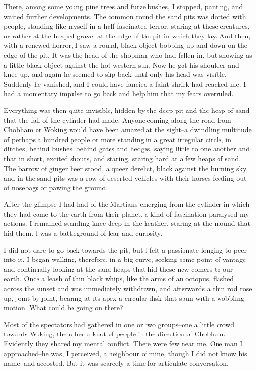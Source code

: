 There, among some young pine trees and furze bushes, I stopped,
panting, and waited further developments. The common round the sand
pits was dotted with people, standing like myself in a
half-fascinated terror, staring at these creatures, or rather at
the heaped gravel at the edge of the pit in which they lay. And
then, with a renewed horror, I saw a round, black object bobbing up
and down on the edge of the pit. It was the head of the shopman who
had fallen in, but showing as a little black object against the hot
western sun. Now he got his shoulder and knee up, and again he
seemed to slip back until only his head was visible. Suddenly he
vanished, and I could have fancied a faint shriek had reached me. I
had a momentary impulse to go back and help him that my fears
overruled.

Everything was then quite invisible, hidden by the deep pit and the
heap of sand that the fall of the cylinder had made. Anyone coming
along the road from Chobham or Woking would have been amazed at the
sight--a dwindling multitude of perhaps a hundred people or more
standing in a great irregular circle, in ditches, behind bushes,
behind gates and hedges, saying little to one another and that in
short, excited shouts, and staring, staring hard at a few heaps of
sand. The barrow of ginger beer stood, a queer derelict, black
against the burning sky, and in the sand pits was a row of deserted
vehicles with their horses feeding out of nosebags or pawing the
ground.

After the glimpse I had had of the Martians emerging from the
cylinder in which they had come to the earth from their planet, a
kind of fascination paralysed my actions. I remained standing
knee-deep in the heather, staring at the mound that hid them. I was
a battleground of fear and curiosity.

I did not dare to go back towards the pit, but I felt a passionate
longing to peer into it. I began walking, therefore, in a big
curve, seeking some point of vantage and continually looking at the
sand heaps that hid these new-comers to our earth. Once a leash of
thin black whips, like the arms of an octopus, flashed across the
sunset and was immediately withdrawn, and afterwards a thin rod
rose up, joint by joint, bearing at its apex a circular disk that
spun with a wobbling motion. What could be going on there?

Most of the spectators had gathered in one or two groups--one a
little crowd towards Woking, the other a knot of people in the
direction of Chobham. Evidently they shared my mental conflict.
There were few near me. One man I approached--he was, I perceived,
a neighbour of mine, though I did not know his name--and accosted.
But it was scarcely a time for articulate conversation.

